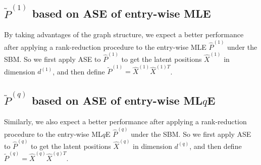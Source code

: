 \documentclass[a4paper]{article}
\begin{document}
\subsection{$\widetilde{P}^{(1)}$ based on ASE of entry-wise MLE}
By taking advantages of the graph structure, we expect a better performance after applying a rank-reduction procedure to the entry-wise MLE $\hat{P}^{(1)}$ under the SBM. So we first apply ASE to $\hat{P}^{(1)}$ to get the latent positions $\hat{X}^{(1)}$ in dimension $d^{(1)}$, and then define $\widetilde{P}^{(1)} = \hat{X}^{(1)} \hat{X}^{{(1)}T}$.



\subsection{$\widetilde{P}^{(q)}$ based on ASE of entry-wise ML$q$E}
Similarly, we also expect a better performance after applying a rank-reduction procedure to the entry-wise ML$q$E $\hat{P}^{(q)}$ under the SBM. So we first apply ASE to $\hat{P}^{(q)}$ to get the latent positions $\hat{X}^{(q)}$ in dimension $d^{(q)}$, and then define $\widetilde{P}^{(q)} = \hat{X}^{(q)} \hat{X}^{{(q)}T}$.
\end{document}
